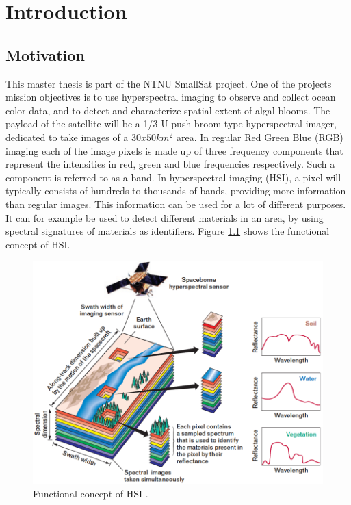 \newpage
\chapter{Introduction}
\label{sec:introduction}
\section{Motivation}

This master thesis is part of the NTNU SmallSat \cite{SmallSat_project_description} project. One of the projects mission objectives is to use hyperspectral imaging to observe and collect ocean color data, and to detect and characterize spatial extent of algal blooms. The payload of the satellite will be a 1/3 U push-broom type hyperspectral imager, dedicated to take images of a $30x50 km^2$ area. In regular Red Green Blue (RGB) imaging each of the image pixels is made up of three frequency components that represent the intensities in red, green and blue frequencies respectively. Such a component is referred to as a band. In hyperspectral imaging (HSI), a pixel will typically consists of hundreds to thousands of bands, providing more information than regular images. This information can be used for a lot of different purposes. It can for example be used to detect different materials in an area, by using spectral signatures of materials as identifiers. Figure \ref{fig:HSI_concept} shows the functional concept of HSI.\\

\begin{figure}[H]
\centering
   \includegraphics[scale=0.35]{images/Imaging-Spectroscopy-Concept.png}
  \caption{ Functional concept of HSI \cite{HSI_concept}. } 
  \label{fig:HSI_concept}
\end{figure}



